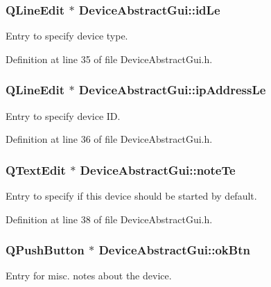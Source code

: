 \hypertarget{class_device_abstract_gui_a00ea569f5e77e7ef80d220fa16d7425d}{
\subsubsection[{id\-Le}]{\setlength{\rightskip}{0pt plus 5cm}Q\-Line\-Edit $\ast$ Device\-Abstract\-Gui\-::id\-Le\hspace{0.3cm}{\ttfamily [private]}}}\label{class_device_abstract_gui_a00ea569f5e77e7ef80d220fa16d7425d}
Entry to specify device type. 

Definition at line 35 of file Device\-Abstract\-Gui.\-h.

\hypertarget{class_device_abstract_gui_aa4ceb1e323954c3eab8af6c480ccc27a}{
\subsubsection[{ip\-Address\-Le}]{\setlength{\rightskip}{0pt plus 5cm}Q\-Line\-Edit $\ast$ Device\-Abstract\-Gui\-::ip\-Address\-Le\hspace{0.3cm}{\ttfamily [private]}}}\label{class_device_abstract_gui_aa4ceb1e323954c3eab8af6c480ccc27a}
Entry to specify device I\-D. 

Definition at line 36 of file Device\-Abstract\-Gui.\-h.

\hypertarget{class_device_abstract_gui_acebd1ea7d32d74423ce7f721dcf19985}{
\subsubsection[{note\-Te}]{\setlength{\rightskip}{0pt plus 5cm}Q\-Text\-Edit $\ast$ Device\-Abstract\-Gui\-::note\-Te\hspace{0.3cm}{\ttfamily [private]}}}\label{class_device_abstract_gui_acebd1ea7d32d74423ce7f721dcf19985}
Entry to specify if this device should be started by default. 

Definition at line 38 of file Device\-Abstract\-Gui.\-h.

\hypertarget{class_device_abstract_gui_ae1d682c75727c75656e2f61dd41ef32a}{
\subsubsection[{ok\-Btn}]{\setlength{\rightskip}{0pt plus 5cm}Q\-Push\-Button $\ast$ Device\-Abstract\-Gui\-::ok\-Btn\hspace{0.3cm}{\ttfamily [private]}}}\label{class_device_abstract_gui_ae1d682c75727c75656e2f61dd41ef32a}
Entry for misc. notes about the device. 

